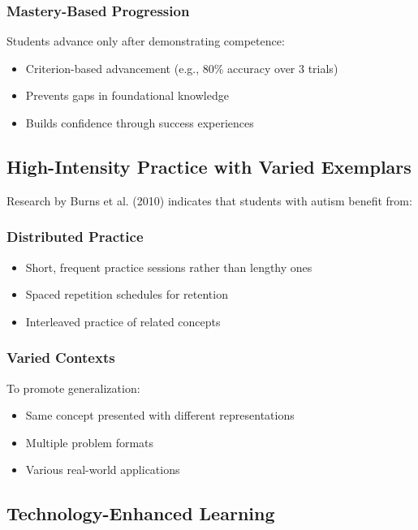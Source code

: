 \documentclass[12pt, a4paper]{article}
\begin{document}
\subsubsection{Mastery-Based Progression}

Students advance only after demonstrating competence:

\begin{itemize}[leftmargin=*]
    \item Criterion-based advancement (e.g., 80\% accuracy over 3 trials)
    \item Prevents gaps in foundational knowledge
    \item Builds confidence through success experiences
\end{itemize}

\subsection{High-Intensity Practice with Varied Exemplars}

Research by Burns et al. (2010) indicates that students with autism benefit from:

\subsubsection{Distributed Practice}

\begin{itemize}[leftmargin=*]
    \item Short, frequent practice sessions rather than lengthy ones
    \item Spaced repetition schedules for retention
    \item Interleaved practice of related concepts
\end{itemize}

\subsubsection{Varied Contexts}

To promote generalization:
\begin{itemize}[leftmargin=*]
    \item Same concept presented with different representations
    \item Multiple problem formats
    \item Various real-world applications
\end{itemize}

\subsection{Technology-Enhanced Learning}
\end{document}
